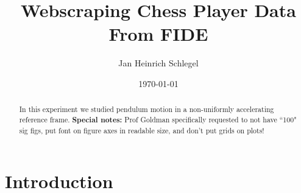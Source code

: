 \documentclass[letterpaper,12pt]{article}
\begin{document}
\title{Webscraping Chess Player Data From FIDE}
\author{Jan Heinrich Schlegel}
\date{\today}
\maketitle

\begin{abstract}
In this experiment we studied pendulum motion in a non-uniformly accelerating reference frame. \textbf{Special notes:} Prof Goldman specifically requested to not have ``100" sig figs, put font on figure axes in readable size, and don't put grids on plots!
\end{abstract}


\section{Introduction}
\end{document}
